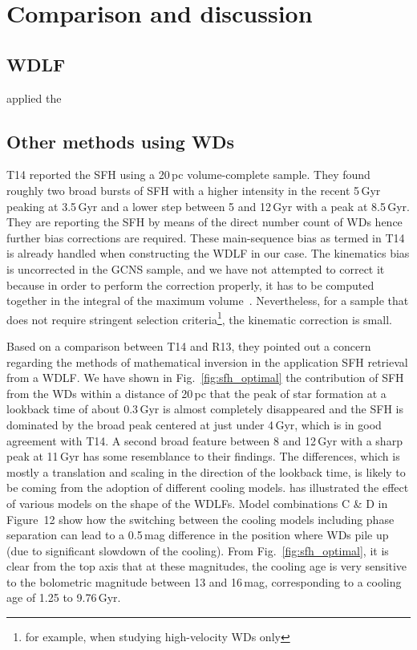 \documentclass[fleqn,usenatbib]{mnras}
\begin{document}
\section{Comparison and discussion}
\label{sec:comparison}
\subsection{WDLF}
\citet{2013MNRAS.434.1549R} applied the 


\subsection{Other methods using WDs}
T14 reported the SFH using a 20\,pc volume-complete sample. They found roughly
two broad bursts of SFH with a higher intensity in the recent 5\,Gyr peaking at
3.5\,Gyr and a lower step between 5 and 12\,Gyr with a peak at 8.5\,Gyr. They
are reporting the SFH by means of the direct number count of WDs hence further
bias corrections are required. These main-sequence bias as termed in T14 
is already handled when constructing the WDLF in our case. The kinematics bias
is uncorrected in the GCNS sample, and we have not attempted to correct it
because in order to perform the correction properly, it has to be computed 
together in the integral of the maximum volume~\citep{2015MNRAS.450.4098L}.
Nevertheless, for a sample that does not require stringent selection
criteria\footnote{for example, when studying high-velocity WDs only}, the
kinematic correction is small.

Based on a comparison between T14 and R13, they pointed out a concern regarding
the methods of mathematical inversion in the application SFH retrieval from a
WDLF. We have shown in Fig.~\ref{fig:sfh_optimal} the contribution of SFH
from the WDs within a distance of 20\,pc that the peak of star formation at a
lookback time of about 0.3\,Gyr is almost completely disappeared and the SFH is
dominated by the broad peak centered at just under 4\,Gyr, which is in good
agreement with T14. A second broad feature between 8 and 12\,Gyr with a sharp
peak at 11\,Gyr has some resemblance to their findings. The differences, which
is mostly a translation and scaling in the direction of the lookback time, is
likely to be coming from the adoption of different cooling models. 
\citet{2022RASTI...1...81L} has illustrated the effect of various models on 
the shape of the WDLFs. Model combinations C \& D in Figure~12 show how the 
switching between the cooling models including phase separation can lead to
a 0.5\,mag difference in the position where WDs pile up (due to significant
slowdown of the cooling). From Fig.~\ref{fig:sfh_optimal}, it is clear from the
top axis that at these magnitudes, the cooling age is very sensitive to the
bolometric magnitude between 13 and 16\,mag, corresponding to a cooling age of
1.25 to 9.76\,Gyr.
\end{document}
